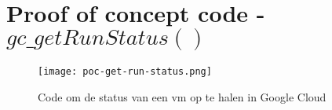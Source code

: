 \section{Proof of concept code - \(gc\_getRunStatus()\)}\label{appendix:poc-get-run-status}
\begin{figure}[hbt!]
  \centering
  \texttt{[image: poc-get-run-status.png]}
  \caption{Code om de status van een \acrshort{vm} op te halen in Google Cloud}
  \label{fig:poc-get-run-status}
\end{figure}

\newpage